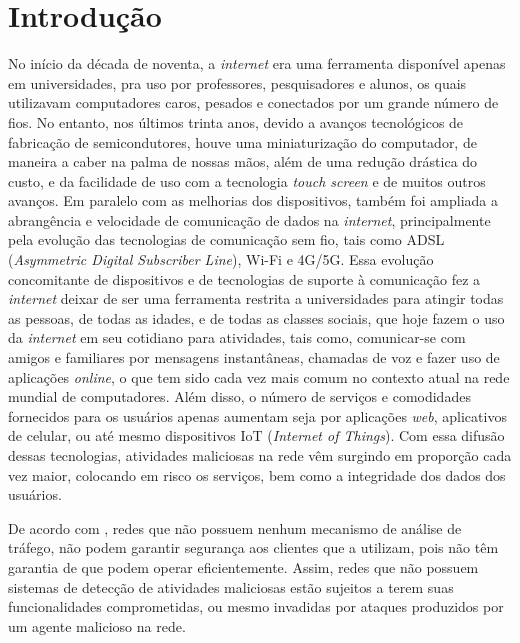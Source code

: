 \chapter[Introdução]{Introdução}
\label{introducao}

No início da década de noventa, a \textit{internet} era uma ferramenta disponível apenas em universidades, pra uso por professores, pesquisadores e alunos, os quais utilizavam computadores caros, pesados e conectados por um grande número de fios. No entanto, nos últimos trinta anos, devido a avanços tecnológicos de fabricação de semicondutores, houve uma miniaturização do computador, de maneira a caber na palma de nossas mãos, além de uma redução drástica do custo, e da facilidade de uso com a tecnologia \textit{touch screen} e de muitos outros avanços. Em paralelo com as melhorias dos dispositivos, também foi ampliada a abrangência e velocidade de comunicação de dados na \textit{internet}, principalmente pela evolução das tecnologias de comunicação sem fio, tais como ADSL (\textit{Asymmetric Digital Subscriber Line}), Wi-Fi e 4G/5G. Essa evolução concomitante de dispositivos e de tecnologias de suporte à comunicação fez a \textit{internet} deixar de ser uma ferramenta restrita a universidades para atingir todas as pessoas, de todas as idades, e de todas as classes sociais, que hoje fazem o uso da \textit{internet} em seu cotidiano para atividades, tais como, comunicar-se com amigos e familiares por mensagens instantâneas, chamadas de voz e fazer uso de aplicações \textit{online}, o que tem sido cada vez mais comum no contexto atual na rede mundial de computadores. Além disso, o número de serviços e comodidades fornecidos para os usuários apenas aumentam seja por aplicações \textit{web}, aplicativos de celular, ou até mesmo dispositivos IoT (\textit{Internet of Things}). Com essa difusão dessas tecnologias, atividades maliciosas na rede vêm surgindo em proporção cada vez maior, colocando em risco os serviços, bem como a integridade dos dados dos usuários. 

De acordo com , redes que não possuem nenhum mecanismo de análise de tráfego, não podem garantir segurança aos clientes que a utilizam, pois não têm garantia de que podem operar eficientemente. Assim, redes que não possuem sistemas de detecção de atividades maliciosas estão sujeitos a terem suas funcionalidades comprometidas, ou mesmo invadidas por ataques produzidos por um agente malicioso na rede.


